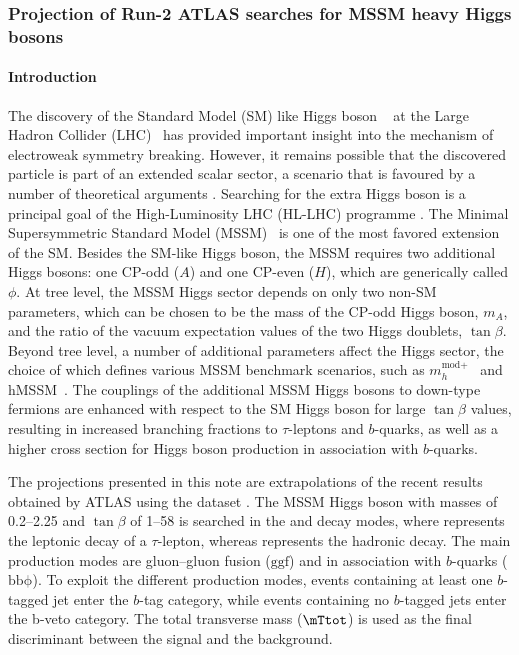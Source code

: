 %

\subsubsection{Projection of Run-2 ATLAS searches for MSSM heavy Higgs bosons}
\paragraph{Introduction}
\label{sec:intro}

The discovery of the Standard Model (SM) like Higgs boson ~\cite{ATLASHiggsJuly2012, CMSHiggsJuly2012}
at the Large Hadron Collider (LHC)~\cite{LHC} has provided important insight into the mechanism of 
electroweak symmetry breaking. However, it remains possible that the discovered particle is part 
of an extended scalar sector, a scenario that is favoured by a number of theoretical arguments 
\cite{Djouadi:2005gj,Branco:2011iw}. Searching for the extra Higgs boson is a principal goal of 
the High-Luminosity LHC (HL-LHC) programme \cite{ecfa15}. The Minimal Supersymmetric Standard 
Model (MSSM)~\cite{Djouadi:2005gj,Fayet:1976et,Fayet:1977yc} is one of the most favored extension 
of the SM. Besides the SM-like Higgs boson, the MSSM requires two additional Higgs bosons: 
one CP-odd ($A$) and one CP-even ($H$), which are generically called $\phi$. 
At tree level, the MSSM Higgs sector depends on only two non-SM parameters, which can be chosen 
to be the mass of the CP-odd Higgs boson, $m_A$, and the ratio of the vacuum expectation values 
of the two Higgs doublets, $\tan\beta$. Beyond tree level, a number of additional parameters 
affect the Higgs sector, the choice of which defines various MSSM benchmark scenarios, such as 
$m_{h}^{\text{mod}+}$~\cite{MSSMBenchmarks} and hMSSM~\cite{Djouadi:2013uqa,Bagnaschi:2015hka}.  
The couplings of the additional MSSM Higgs bosons to down-type fermions are enhanced with respect to 
the SM Higgs boson for large $\tan\beta$ values, resulting in increased branching fractions to 
$\tau$-leptons and $b$-quarks, as well as a higher cross section for Higgs boson production
in association with $b$-quarks.

The projections presented in this note are extrapolations of the recent results obtained by ATLAS
using the \RunTwo dataset \cite{ATLASRun2Ditau}.  The MSSM Higgs boson with masses of 
0.2--\SI{2.25}{\UTeV} and $\tan\beta$ of 1--58 is searched in the \lephad and \hadhad decay modes, 
where \taulep represents the leptonic decay of a $\tau$-lepton, whereas \tauhad represents 
the hadronic decay. The main production modes are gluon--gluon fusion ($\mathrm{ggf}$) and in association 
with $b$-quarks ($\mathrm{bb\phi}$).  
To exploit the different production modes, events containing at least one $b$-tagged jet enter 
the $b$-tag category, while events containing no $b$-tagged jets enter the b-veto category.
The total transverse mass ($\mTtot$) is used as the final discriminant between the signal and the background. 

